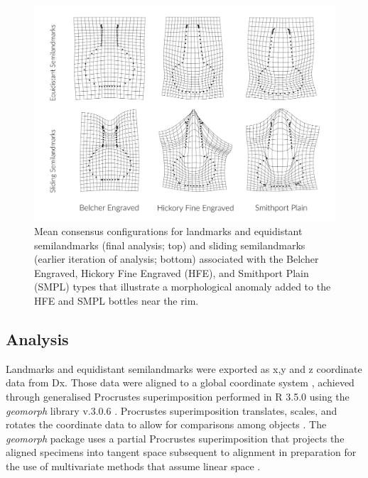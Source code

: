 \documentclass[review]{elsarticle}
\begin{document}
\begin{figure}[ht]\centering
\includegraphics[width=\linewidth]{slide}
\caption{Mean consensus configurations for landmarks and equidistant semilandmarks (final analysis; top) and sliding semilandmarks (earlier iteration of analysis; bottom) associated with the Belcher Engraved, Hickory Fine Engraved (HFE), and Smithport Plain (SMPL) types that illustrate a morphological anomaly added to the HFE and SMPL bottles near the rim.}
\label{fig:slide}
\end{figure}

\subsection{Analysis}

Landmarks and equidistant semilandmarks were exported as x,y and z coordinate data from Dx. Those data were aligned to a global coordinate system \citep{RN11622,RN11623,RN11563}, achieved through generalised Procrustes superimposition \citep{RN478} performed in R 3.5.0 \citep{R} using the \textit{geomorph} library v.3.0.6 \citep{RN11530,RN1774}. Procrustes superimposition translates, scales, and rotates the coordinate data to allow for comparisons among objects \citep{RN11564,RN478}. The \textit{geomorph} package uses a partial Procrustes superimposition that projects the aligned specimens into tangent space subsequent to alignment in preparation for the use of multivariate methods that assume linear space \citep{RN1646,RN11563}.
\end{document}
